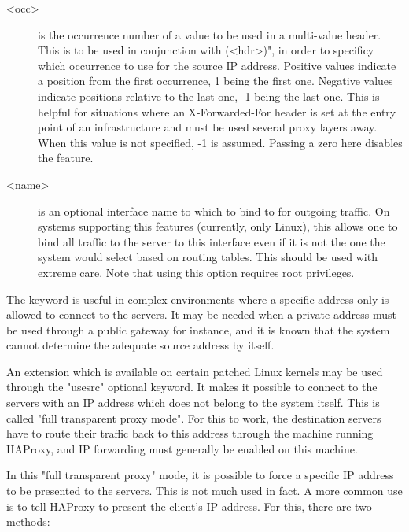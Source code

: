 {\begin{description}
  \item[<occ>] is the occurrence number of a value to be used in a multi-value
              header. This is to be used in conjunction with (<hdr>)",
              in order to specificy which occurrence to use for the source IP
              address. Positive values indicate a position from the first
              occurrence, 1 being the first one. Negative values indicate
              positions relative to the last one, -1 being the last one. This
              is helpful for situations where an X-Forwarded-For header is set
              at the entry point of an infrastructure and must be used several
              proxy layers away. When this value is not specified, -1 is
              assumed. Passing a zero here disables the feature.

  \item[<name>] is an optional interface name to which to bind to for outgoing
              traffic. On systems supporting this features (currently, only
              Linux), this allows one to bind all traffic to the server to
              this interface even if it is not the one the system would select
              based on routing tables. This should be used with extreme care.
              Note that using this option requires root privileges.
  \end{description}

  The  keyword is useful in complex environments where a specific
  address only is allowed to connect to the servers. It may be needed when a
  private address must be used through a public gateway for instance, and it is
  known that the system cannot determine the adequate source address by itself.

  An extension which is available on certain patched Linux kernels may be used
  through the "usesrc" optional keyword. It makes it possible to connect to the
  servers with an IP address which does not belong to the system itself. This
  is called "full transparent proxy mode". For this to work, the destination
  servers have to route their traffic back to this address through the machine
  running HAProxy, and IP forwarding must generally be enabled on this machine.

  In this "full transparent proxy" mode, it is possible to force a specific IP
  address to be presented to the servers. This is not much used in fact. A more
  common use is to tell HAProxy to present the client's IP address. For this,
  there are two methods:

}
